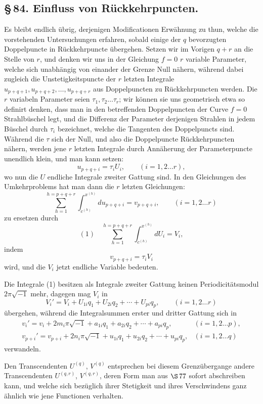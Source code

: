 \documentclass[10pt]{article}
\begin{document}
\subsection*{\S\,84. Einfluss von Rückkehrpuncten.}

Es bleibt endlich übrig, derjenigen Modificationen Erwähnung zu thun, welche die vorstehenden Untersuchungen erfahren, sobald einige der \(q\) bevorzugten Doppelpuncte in Rückkehrpuncte übergehen. Setzen wir im Vorigen \(q+r\) an die Stelle von \(r\), und denken wir uns in der Gleichung \(f=0\) \(r\) variable Parameter, welche sich unabhängig von einander der Grenze Null nähern, während dabei zugleich die Unstetigkeitspuncte der \(r\) letzten Integrale \(u_{p+q+1},u_{p+q+2},\ldots,u_{p+q+r}\) aus Doppelpuncten zu Rückkehrpuncten werden. Die \(r\) variabeln Parameter seien \(\tau_1,\tau_2\ldots\tau_r\); wir können sie uns geometrisch etwa so definirt denken, dass man in den betreffenden Doppelpuncten der Curve \(f=0\) Strahlbüschel legt, und die Differenz der Parameter derjenigen Strahlen in jedem Büschel durch \(\tau_i\) bezeichnet, welche die Tangenten des Doppelpuncts sind. Während die \(\tau\) sich der Null, und also die Doppelpuncte Rückkehrpuncten nähern, werden jene \(r\) letzten Integrale durch Annäherung der Parameterpuncte unendlich klein, und man kann setzen:
\[
u_{p+q+i}=\tau_iU_i,
\qquad (i=1,2\ldots r),
\]
wo nun die \(U\) endliche Integrale zweiter Gattung sind. In den Gleichungen des Umkehrproblems hat man dann die \(r\) letzten Gleichungen:
\[
\sum_{h=1}^{h=p+q+r}\int_{c^{(h)}}^{x^{(h)}}du_{p+q+i}=v_{p+q+i},
\qquad (i=1,2\ldots r)
\]
zu ersetzen durch
\[
(1)\quad \sum_{h=1}^{h=p+q+r}\int_{c^{(h)}}^{x^{(h)}}dU_i=V_i,
\]
indem
\[
v_{p+q+i}=\tau_iV_i
\]
wird, und die \(V_i\) jetzt endliche Variable bedeuten.

Die Integrale (1) besitzen als Integrale zweiter Gattung keinen Periodicitätsmodul \(2\pi\sqrt{-1}\) mehr, dagegen mag \(V_i\) in
\[
V_i'=V_i+U_{1i}q_1+U_{2i}q_2+\cdots+U_{pi}q_p,
\qquad (i=1,2\ldots r)
\]
übergehen, während die Integralsummen erster und dritter Gattung sich in
\[
\begin{array}{ll}
v_i'=v_i+2m_i\pi\sqrt{-1}+a_{1i}q_1+a_{2i}q_2+\cdots+a_{pi}q_p,&(i=1,2\ldots p),\\
v_{p+i}'=v_{p+i}+2n_i\pi\sqrt{-1}+u_{1i}q_1+u_{2i}q_2+\cdots+u_{pi}q_p,&(i=1,2\ldots q)
\end{array}
\]
verwandeln.

Den Transcendenten \(U^{(q)}\), \(V^{(q)}\) entsprechen bei diesem Grenzübergange andere Transcendenten \(U^{(q,r)}\), \(V^{(q,r)}\), deren Form man aus \(\S\,77\) sofort abschreiben kann, und welche sich bezüglich ihrer Stetigkeit und ihres Verschwindens ganz ähnlich wie jene Functionen verhalten.
\end{document}
